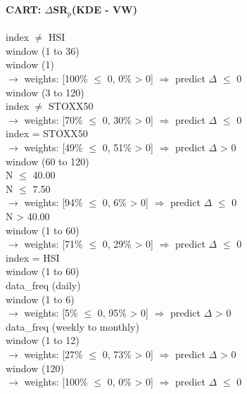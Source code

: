 \
\paragraph{CART: $\Delta$SR$_p$(KDE - VW)}

\begin{flushleft}
\ttfamily %
index $\neq$ HSI \\
\quad window (1 to 36) \\
\quad \quad window (1) \\
\quad \quad \quad \quad $\rightarrow$ weights: [100\% $\leq$ 0, 0\% > 0] $\Rightarrow$ predict $\Delta$ $\leq$ 0 \\
\quad \quad window (3 to 120) \\
\quad \quad \quad index $\neq$ STOXX50 \\
\quad \quad \quad \quad $\rightarrow$ weights: [70\% $\leq$ 0, 30\% > 0] $\Rightarrow$ predict $\Delta$ $\leq$ 0 \\
\quad \quad \quad index = STOXX50 \\
\quad \quad \quad \quad $\rightarrow$ weights: [49\% $\leq$ 0, 51\% > 0] $\Rightarrow$ predict $\Delta$ > 0 \\
\quad window (60 to 120) \\
\quad \quad N $\leq$ 40.00 \\
\quad \quad \quad N $\leq$ 7.50 \\
\quad \quad \quad \quad $\rightarrow$ weights: [94\% $\leq$ 0, 6\% > 0] $\Rightarrow$ predict $\Delta$ $\leq$ 0 \\
\quad \quad N > 40.00 \\
\quad \quad \quad window (1 to 60) \\
\quad \quad \quad \quad $\rightarrow$ weights: [71\% $\leq$ 0, 29\% > 0] $\Rightarrow$ predict $\Delta$ $\leq$ 0 \\
index = HSI \\
\quad window (1 to 60) \\
\quad \quad data\_freq (daily) \\
\quad \quad \quad window (1 to 6) \\
\quad \quad \quad \quad $\rightarrow$ weights: [5\% $\leq$ 0, 95\% > 0] $\Rightarrow$ predict $\Delta$ > 0 \\
\quad \quad data\_freq (weekly to monthly) \\
\quad \quad \quad window (1 to 12) \\
\quad \quad \quad \quad $\rightarrow$ weights: [27\% $\leq$ 0, 73\% > 0] $\Rightarrow$ predict $\Delta$ > 0 \\
\quad window (120) \\
\quad \quad \quad \quad $\rightarrow$ weights: [100\% $\leq$ 0, 0\% > 0] $\Rightarrow$ predict $\Delta$ $\leq$ 0 \\
\end{flushleft}
